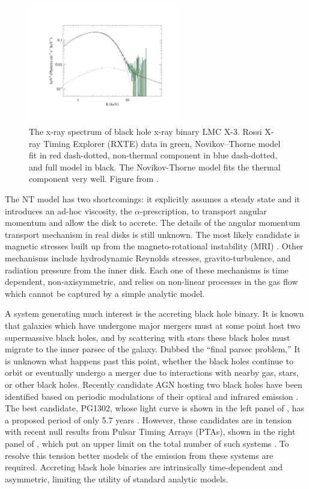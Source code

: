\begin{figure}
\begin{center}
\includegraphics[width=0.6\textwidth]{figures/lmcx3spec.pdf}
\end{center}
\caption{The x-ray spectrum of black hole x-ray binary LMC X-3.  Rossi X-ray Timing Explorer (RXTE) data in green, Novikov--Thorne model fit in red dash-dotted, non-thermal component in blue dash-dotted, and full model in black.  The Novikov-Thorne model fits the thermal component very well. Figure from \cite{Steiner14}. }
\end{figure}

The NT model has two shortcomings: it explicitly assumes a steady state and it introduces an ad-hoc viscosity, the $\alpha$-prescription, to transport angular momentum and allow the disk to accrete.  The details of the angular momentum transport mechanism in real disks is still unknown.  The most likely candidate is magnetic stresses built up from the magneto-rotational instability (MRI) \citep{Balbus91}.  Other mechanisms include hydrodynamic Reynolds stresses, gravito-turbulence, and radiation pressure from the inner disk.  Each one of these mechanisms is time dependent, non-axisymmetric, and relies on non-linear processes in the gas flow which cannot be captured by a simple analytic model.

A system generating much interest is the accreting black hole binary.  It is known that galaxies which have undergone major mergers must at some point host two supermassive black holes, and by scattering with stars these black holes must migrate to the inner parsec of the galaxy.  Dubbed the ``final parsec problem,'' It is unknown what happens past this point, whether the black holes continue to orbit or eventually undergo a merger due to interactions with nearby gas, stars, or other black holes.  Recently candidate AGN hosting two black holes have been identified based on periodic modulations of their optical and infrared emission \citep{Graham15B, Charisi16}.  The best candidate, PG1302, whose light curve is shown in the left panel of , has a proposed period of only 5.7 years \citep{Graham15A}.  However, these candidates are in tension with recent null results from Pulsar Timing Arrays (PTAs), shown in the right panel of , which put an upper limit on the total number of such systems \citep{NanogravLimits, Sesana17}.   To resolve this tension better models of the emission from these systems are required.  Accreting black hole binaries are intrinsically time-dependent and asymmetric, limiting the utility of standard analytic models.  

